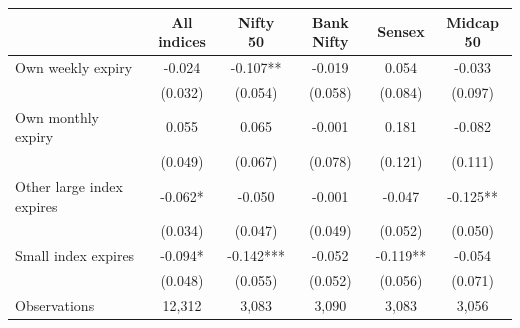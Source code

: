 \begin{tabular}{lccccc}
\toprule
 & All indices & Nifty 50 & Bank Nifty & Sensex & Midcap 50 \\
\midrule
Own weekly expiry & -0.024 & -0.107** & -0.019 & 0.054 & -0.033 \\
 & (0.032) & (0.054) & (0.058) & (0.084) & (0.097) \\
Own monthly expiry & 0.055 & 0.065 & -0.001 & 0.181 & -0.082 \\
 & (0.049) & (0.067) & (0.078) & (0.121) & (0.111) \\
Other large index expires & -0.062* & -0.050 & -0.001 & -0.047 & -0.125** \\
 & (0.034) & (0.047) & (0.049) & (0.052) & (0.050) \\
Small index expires & -0.094* & -0.142*** & -0.052 & -0.119** & -0.054 \\
 & (0.048) & (0.055) & (0.052) & (0.056) & (0.071) \\
\midrule
Observations & 12,312 & 3,083 & 3,090 & 3,083 & 3,056 \\
\bottomrule
\end{tabular}